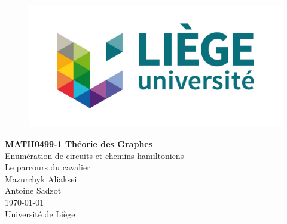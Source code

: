 \begin{titlepage}

   \begin{figure}[htbp]
      \centering
      \includegraphics{img/uliege-logo-couleurs-300.jpg}
   \end{figure}
  	
  	\hfill

	\begin{center}
		\vfill
		\textbf{
		\Huge{MATH0499-1 Théorie des Graphes}}\\
		\bigskip
		\huge{Enumération de circuits et chemins hamiltoniens \\Le parcours du cavalier}\\
		\bigskip %
		\smallskip
		\Large{Mazurchyk Aliaksei\\Antoine Sadzot} \\
		\bigskip
		\smallskip
		\large{\today}\\%
		\vfill
		\large{Université de Liège}
	\end{center}
\end{titlepage}
